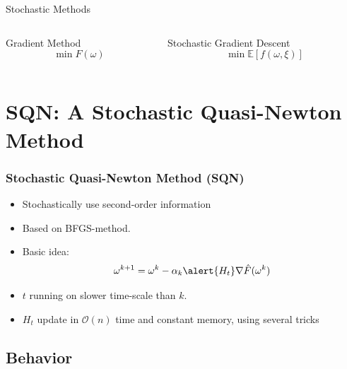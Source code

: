 \documentclass[10pt]{beamer}
\begin{document}
  \begin{frame}{Stochastic Methods}
    \begin{columns}[T]
      \begin{column}{.5\textwidth}
        \centering \alert{Gradient Method}
        $$\min F(\omega) $$

      \end{column}\hfill
      \begin{column}{.5\textwidth}
        \centering \alert{Stochastic Gradient Descent}
        $$\min \mathbb E \left [f(\omega, \xi)\right]$$
      \end{column}
    \end{columns}
  \end{frame}

\section{SQN: A Stochastic Quasi-Newton Method}

  \begin{frame}\frametitle{Stochastic Quasi-Newton Method (SQN)}
      \begin{itemize}
        \item \alert{Stochastically} use second-order information
        \item Based on BFGS-method.
        \pause
        \item Basic idea: $$ \omega^{k+1} = \omega^{k} - \alpha_k \alert{H_t} \nabla \hat F(\omega^{k})$$
        \pause
        \item $t$ running on slower time-scale than $k$. 
        \item $H_t$ update in $\mathcal O(n)$ time and constant memory, using several tricks
      \end{itemize}
  \end{frame}

  \subsection*{Behavior}
\end{document}
